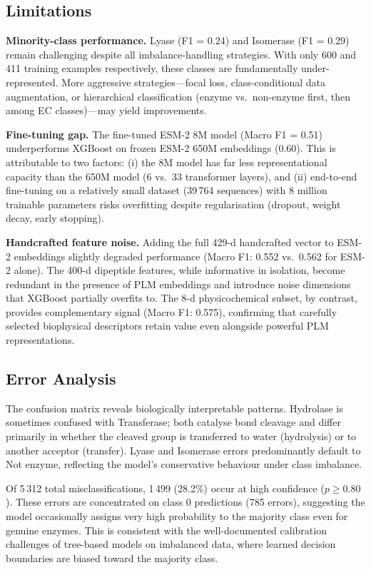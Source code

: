 \documentclass[11pt,a4paper]{article}
\begin{document}
\subsection{Limitations}
\textbf{Minority-class performance.}
Lyase (F1 = 0.24) and Isomerase (F1 = 0.29) remain challenging despite all imbalance-handling
strategies.
With only 600 and 411 training examples respectively, these classes are fundamentally
under-represented.
More aggressive strategies---focal loss, class-conditional data augmentation, or hierarchical
classification (enzyme vs.\ non-enzyme first, then among EC classes)---may yield improvements.

\textbf{Fine-tuning gap.}
The fine-tuned ESM-2 8M model (Macro F1 = 0.51) underperforms XGBoost on frozen ESM-2 650M
embeddings (0.60).
This is attributable to two factors: (i) the 8M model has far less representational capacity
than the 650M model (6 vs.\ 33 transformer layers), and (ii) end-to-end fine-tuning on a
relatively small dataset (39\,764 sequences) with 8 million trainable parameters risks
overfitting despite regularisation (dropout, weight decay, early stopping).

\textbf{Handcrafted feature noise.}
Adding the full 429-d handcrafted vector to ESM-2 embeddings slightly degraded performance
(Macro F1: 0.552 vs.\ 0.562 for ESM-2 alone).
The 400-d dipeptide features, while informative in isolation, become redundant in the presence
of PLM embeddings and introduce noise dimensions that XGBoost partially overfits to.
The 8-d physicochemical subset, by contrast, provides complementary signal (Macro F1: 0.575),
confirming that carefully selected biophysical descriptors retain value even alongside powerful
PLM representations.

\subsection{Error Analysis}
The confusion matrix reveals biologically interpretable patterns.
Hydrolase is sometimes confused with Transferase; both catalyse bond cleavage and differ
primarily in whether the cleaved group is transferred to water (hydrolysis) or to another
acceptor (transfer).
Lyase and Isomerase errors predominantly default to Not enzyme, reflecting the model's
conservative behaviour under class imbalance.

Of 5\,312 total misclassifications, 1\,499 (28.2\%) occur at high confidence ($p \ge 0.80$).
These errors are concentrated on class 0 predictions (785 errors), suggesting the model
occasionally assigns very high probability to the majority class even for genuine enzymes.
This is consistent with the well-documented calibration challenges of tree-based models on
imbalanced data, where learned decision boundaries are biased toward the majority class.
\end{document}
